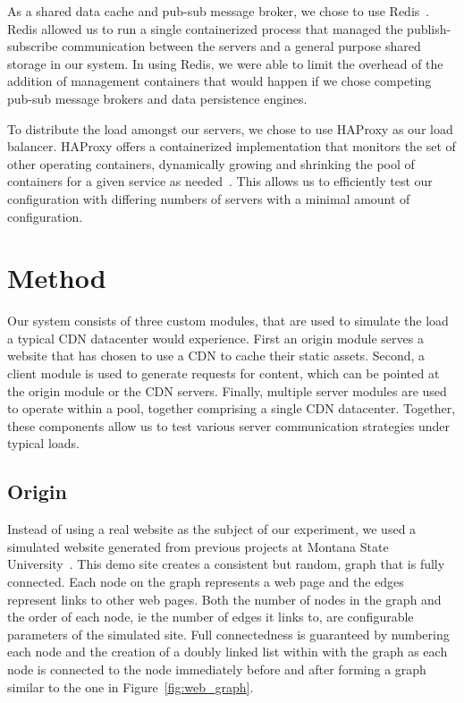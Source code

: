 \documentclass[conference]{IEEEtran}
\begin{document}
As a shared data cache and pub-sub message broker, we chose to use Redis~\cite{redis}.  Redis allowed us to run a single containerized process that managed the publish-subscribe communication between the servers and a general purpose shared storage in our system. In using Redis, we were able to limit the overhead of the addition of management containers that would happen if we chose competing pub-sub message brokers and data persistence engines.

To distribute the load amongst our servers, we chose to use HAProxy as our load balancer.  HAProxy offers a containerized implementation that monitors the set of other operating containers, dynamically growing and shrinking the pool of containers for a given service as needed~\cite{haproxy}.  This allows us to efficiently test our configuration with differing numbers of servers with a minimal amount of configuration.

\section{Method}\label{sec:method}
Our system consists of three custom modules, that are used to simulate the load a typical CDN datacenter would experience.  First an origin module serves a website that has chosen to use a CDN to cache their static assets.  Second, a client module is used to generate requests for content, which can be pointed at the origin module or the CDN servers.  Finally, multiple server modules are used to operate within a pool, together comprising a single CDN datacenter.  Together, these components allow us to test various server communication strategies under typical loads.
\subsection*{Origin}


Instead of using a real website as the subject of our experiment, we used a simulated website generated from previous projects at Montana State University~\cite{pipelines}.  This demo site creates a consistent but random, graph that is fully connected.  Each node on the graph represents a web page and the edges represent links to other web pages.  Both the number of nodes in the graph and the order of each node, ie the number of edges it links to, are configurable parameters of the simulated site.  Full connectedness is guaranteed by numbering each node and the creation of a doubly linked list within with the graph as each node is connected to the node immediately before and after forming a graph similar to the one in Figure~\ref{fig:web_graph}.
\end{document}
